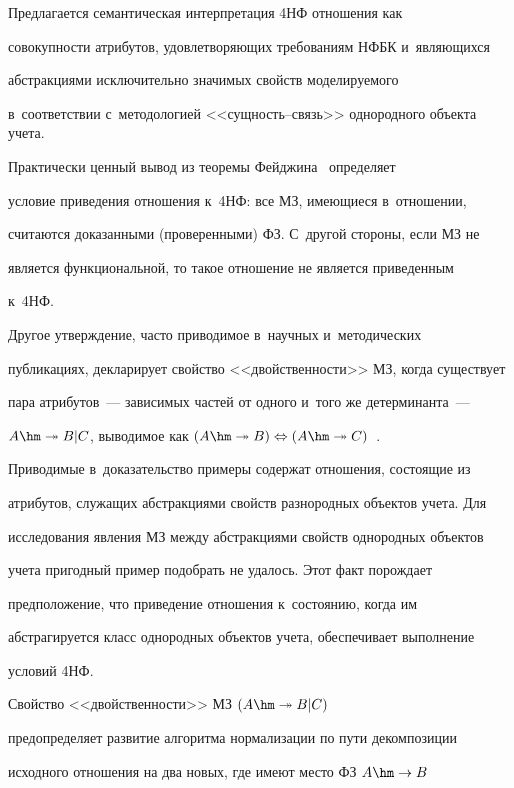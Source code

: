   Предлагается семантическая интерпретация 4НФ отношения как 

совокупности атрибутов, удовле\-тво\-ря\-ющих требованиям НФБК и~яв\-ля\-ющих\-ся 

абстракциями исключительно значимых свойств мо\-де\-ли\-ру\-емо\-го 

в~соответствии с~методологией <<сущ\-ность--связь>> однородного объекта учета. 

  

  Практически ценный вывод из теоремы Фейджина~\cite{13-iv} определяет 

условие приведения отношения к~4НФ: все МЗ, имеющиеся в~отношении, 

считаются доказанными (проверенными) ФЗ. С~другой стороны, если МЗ не 

является функциональной, то такое отношение не является приведенным 

к~4НФ. 

  

  Другое утверждение, часто приводимое в~научных и~методических 

публикациях, декларирует свойство <<двойственности>> МЗ, когда существует 

пара атрибутов~--- зависимых частей от одного и~того же детерминанта~--- 

$A\hm\twoheadrightarrow B\vert C$, выводимое как $(A\hm\twoheadrightarrow  

B) \Leftrightarrow (A \hm\twoheadrightarrow  C)$~\cite{9-iv, 13-iv, 20-iv}. 

Приводимые в~доказательство примеры содержат отношения, состоящие из 

атрибутов, служащих абстракциями свойств разнородных объектов учета. Для 

исследования явления МЗ между абстракциями свойств однородных объектов 

учета пригодный пример подобрать не удалось. Этот факт порождает 

предположение, что приведение отношения к~состоянию, когда им 

абстрагируется класс однородных объектов учета, обеспечивает выполнение 

условий 4НФ.

  

  Свойство <<двойственности>> МЗ $(A \hm\twoheadrightarrow  B\vert C)$ 

предопределяет развитие алгоритма нормализации по пути декомпозиции 

исходного отношения на два новых, где имеют место ФЗ $A\hm\to B$ 

